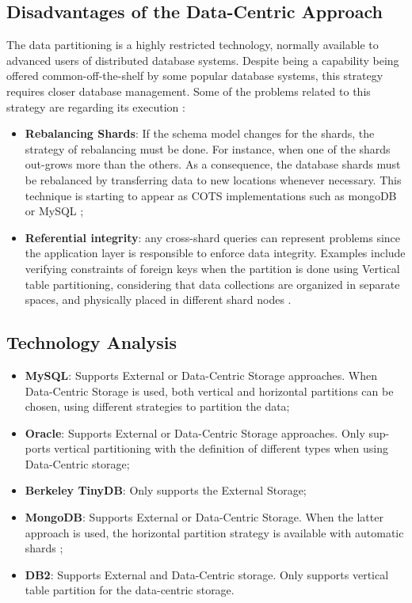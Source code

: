 \subsection{Disadvantages of the Data-Centric Approach}

The data partitioning is a highly restricted technology, normally available to
advanced users of distributed database systems. Despite being a capability
being offered common-off-the-shelf by some popular database systems, this
strategy requires closer database management. Some of the problems related to
this strategy are regarding its execution \cite{db-shard-discussion}:

\begin{itemize}
  \item \textbf{Rebalancing Shards}: If the schema model changes for the
  shards, the strategy of rebalancing must be done. For instance, when one of
  the shards out-grows more than the others. As a consequence, the database
  shards must be rebalanced by transferring data to new locations whenever
  necessary. This technique is starting to appear as COTS implementations such
  as mongoDB \cite{mongodb} or MySQL \cite{mysql};
  \item \textbf{Referential integrity}: any cross-shard queries can represent
  problems since the application layer is responsible to enforce data
  integrity. Examples include verifying constraints of foreign keys when the
  partition is done using Vertical table partitioning, considering that data
  collections are organized in separate spaces, and physically placed in
  different shard nodes \cite{db-table-partition}.
\end{itemize}

\subsection{Technology Analysis}

\begin{itemize}
  \item \textbf{MySQL}: Supports External or Data-Centric Storage approaches.
  When Data-Centric Storage is used, both vertical and horizontal partitions
  \cite{db-partitioning-relational} can be  chosen, using different strategies
  to partition the data;
  \item \textbf{Oracle}: Supports External or Data-Centric Storage approaches.
  Only sup-  ports vertical partitioning with the definition of different types
  \cite{db-table-partition, db-partitioning-relational-oracle} when using
  Data-Centric storage;
  \item \textbf{Berkeley TinyDB}: Only supports the External Storage;
  \item \textbf{MongoDB}: Supports External or Data-Centric Storage. When the
  latter approach is used, the horizontal partition strategy is available with
  automatic shards \cite{db-mongo-partition};
  \item \textbf{DB2}: Supports External and Data-Centric storage. Only supports
  vertical table partition \cite{db-db2-partition} for the data-centric storage.
\end{itemize}

